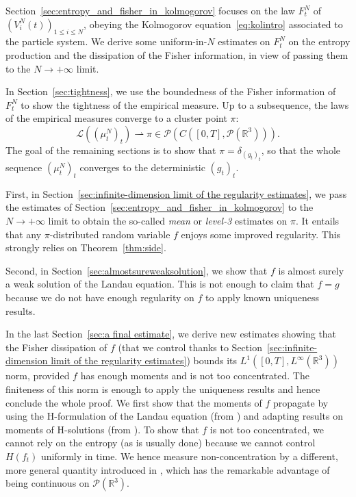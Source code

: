 \documentclass[11pt,a4paper]{article}
\theoremstyle{definition}
\theoremstyle{plain}
\begin{document}
Section~\ref{sec:entropy_and_fisher_in_kolmogorov} focuses on the law $F^N_t$ of $(V^N_i(t))_{1\leq i \leq N}$, obeying the Kolmogorov equation~\eqref{eq:kolintro} associated to the particle system. We derive some uniform-in-$N$ estimates on $F^N_t$ on the entropy production and the dissipation of the Fisher information, in view of passing them to the $N\rightarrow +\infty$ limit. 

In Section~\ref{sec:tightness}, we use the boundedness of the Fisher information of $F^N_t$ to show the tightness of the empirical measure. Up to a subsequence, the laws of the empirical measures converge to a cluster point $\pi$:
$$\mathcal{L}((\mu^N_t)_t) \rightharpoonup \pi \in \mathcal{P}(C([0,T],\mathcal{P}(\mathbb{R}^3))).$$
The goal of the remaining sections is to show that $\pi=\delta_{(g_t)_t}$, so that the whole sequence $(\mu^N_t)_t$ converges to the deterministic $(g_t)_t$.

First, in Section~\ref{sec:infinite-dimension limit of the regularity estimates}, we pass the estimates of Section~\ref{sec:entropy_and_fisher_in_kolmogorov} to the $N\rightarrow +\infty$ limit to obtain the so-called \textit{mean} or \textit{level-3} estimates on $\pi$. It entails that any $\pi$-distributed random variable $f$ enjoys some improved regularity. This strongly relies on Theorem~\ref{thm:side}.

Second, in Section~\ref{sec:almostsureweaksolution}, we show that $f$ is almost surely a weak solution of the Landau equation. This is not enough to claim that $f=g$ because we do not have enough regularity on $f$ to apply known uniqueness results.

In the last Section~\ref{sec:a final estimate}, we derive new estimates showing that the Fisher dissipation of $f$ (that we control thanks to Section~\ref{sec:infinite-dimension limit of the regularity estimates}) bounds its $L^1([0,T],L^\infty(\mathbb{R}^3))$ norm, provided $f$ has enough moments and is not too concentrated. The finiteness of this norm is enough to apply the uniqueness results \cite{GuerinFournier2008, Fournier2010} and hence conclude the whole proof. We first show that the moments of $f$ propagate by using the H-formulation of the Landau equation (from \cite{Villani1998}) and adapting results on moments of H-solutions (from \cite{CarrapatosoDesvillettesHe2015}). To show that $f$ is not too concentrated, we cannot rely on the entropy (as is usually done) because we cannot control $H(f_t)$ uniformly in time. We hence measure non-concentration by a different, more general quantity introduced in \cite{FournierHauray2015}, which has the remarkable advantage of being continuous on $\mathcal{P}(\mathbb{R}^3)$.
\end{document}
